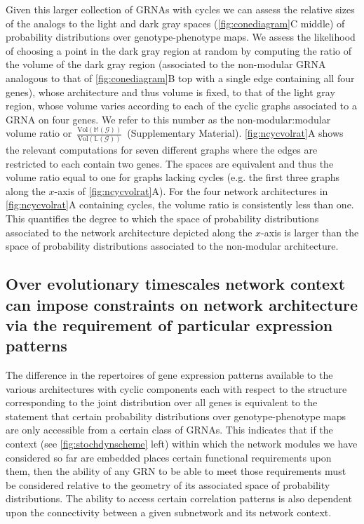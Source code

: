 Given this larger collection of GRNAs with cycles we can assess the relative sizes of the analogs to the light and dark gray spaces (\ref{fig:conediagram}C middle) of probability distributions over genotype-phenotype maps. We assess the likelihood of choosing a point in the dark gray region at random by computing the ratio of the volume of the dark gray region (associated to the non-modular GRNA analogous to that of \ref{fig:conediagram}B top with a single edge containing all four genes), whose architecture and thus volume is fixed, to that of the light gray region, whose volume varies according to each of the cyclic graphs associated to a GRNA on four genes. We refer to this number as the non-modular:modular volume ratio or~$\frac{\text{Vol}(\mathbb{M}(\mathcal{G}))}{\text{Vol}(\mathbb{L}(\mathcal{G}))}$~(Supplementary Material). \ref{fig:ncycvolrat}A shows the relevant computations for seven different graphs where the edges are restricted to each contain two genes. The spaces are equivalent and thus the volume ratio equal to one for graphs lacking cycles (e.g. the first three graphs along the $x$-axis of \ref{fig:ncycvolrat}A). For the four network architectures in \ref{fig:ncycvolrat}A containing cycles, the volume ratio is consistently less than one. This quantifies the degree to which the space of probability distributions associated to the network architecture depicted along the $x$-axis is larger than the space of probability distributions associated to the non-modular architecture.

\subsection{Over evolutionary timescales network context can impose constraints on network architecture via the requirement of particular expression patterns}

The difference in the repertoires of gene expression patterns available to the various architectures with cyclic components each with respect to the structure corresponding to the joint distribution over all genes is equivalent to the statement that certain probability distributions over genotype-phenotype maps are only accessible from a certain class of GRNAs. This indicates that if the context (see \ref{fig:stochdynscheme} left) within which the network modules we have considered so far are embedded places certain functional requirements upon them, then the ability of any GRN to be able to meet those requirements must be considered relative to the geometry of its associated space of probability distributions. The ability to access certain correlation patterns is also dependent upon the connectivity between a given subnetwork and its network context.

